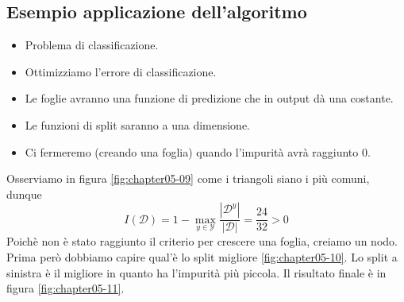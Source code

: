 	\subsection{Esempio applicazione dell'algoritmo}
	\begin{multicols}{2}
		\begin{itemize}
			\item Problema di classificazione.
			\item Ottimizziamo l'errore di classificazione.
			\item Le foglie avranno una funzione di predizione che in output d\`a una costante.
			\item Le funzioni di split saranno a una dimensione.
			\item Ci fermeremo (creando una foglia) quando l'impurit\`a avr\`a raggiunto $0$.
		\end{itemize}
	\end{multicols}
	Osserviamo in figura \ref{fig:chapter05-09} come i triangoli siano i pi\`u comuni, dunque  $$I(\mathcal{D})= 1 -\max\limits_{y\in\mathcal{Y}}\dfrac{|\mathcal{D}^y|}{|\mathcal{D}|} = \frac{24}{32} > 0$$
	Poich\`e non \`e stato raggiunto il criterio per crescere una foglia, creiamo un nodo. 
	Prima per\`o dobbiamo capire qual'\`e lo split migliore \ref{fig:chapter05-10}. 
	Lo split a sinistra \`e il migliore in quanto ha l'impurit\`a pi\`u piccola. 
	Il risultato finale \`e in figura \ref{fig:chapter05-11}.
